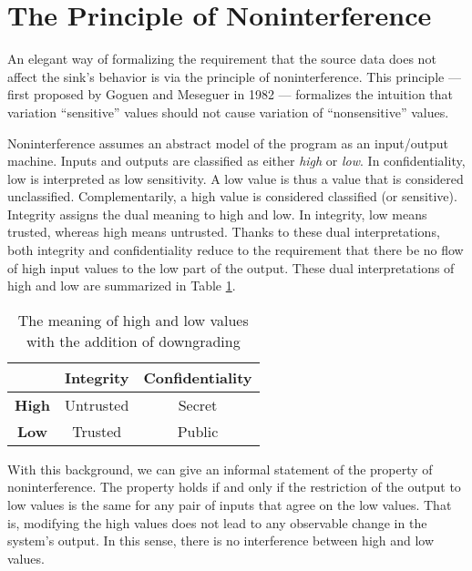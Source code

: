 \section{The Principle of Noninterference}

An elegant way of formalizing the requirement that the source data does not affect the sink's behavior is via the principle of noninterference. This principle --- first proposed by Goguen and Meseguer in 1982 \cite{GoguenMeseguer} --- formalizes the intuition that variation ``sensitive'' values should not cause variation of ``nonsensitive'' values.

Noninterference assumes an abstract model of the program as an input/output machine. Inputs and outputs are classified as either \emph{high} or \emph{low}.
%
In confidentiality, low is interpreted as low sensitivity. A low value is thus a value that is considered unclassified. Complementarily, a high value is considered classified (or sensitive). Integrity assigns the dual meaning to high and low. 
In integrity, low means trusted, whereas high means untrusted. Thanks to these dual interpretations, both integrity and confidentiality reduce to the requirement that there be no flow of high input values to the low part of the output.
%
These dual interpretations of high and low are summarized in Table \ref{Ta:highlow}.

\begin{table}
	\begin{center}
		\begin{tabular}{|c|c|c|}
			\hline
			& {\bf Integrity} & {\bf Confidentiality} \\ \hline
			{\bf High}	& Untrusted & Secret \\ \hline
			{\bf Low} & Trusted & Public \\ 		
			\hline
		\end{tabular}
	\end{center}
	\caption{\label{Ta:highlow}The meaning of high and low values with the addition of downgrading}
\end{table} 

With this background, we can give an informal statement of the property of noninterference. The property holds if and only if the restriction of the output to low values is the same for any pair of inputs that agree on the low values. That is, modifying the high values does not lead to any observable change in the system's output. In this sense, there is no interference between high and low values.

